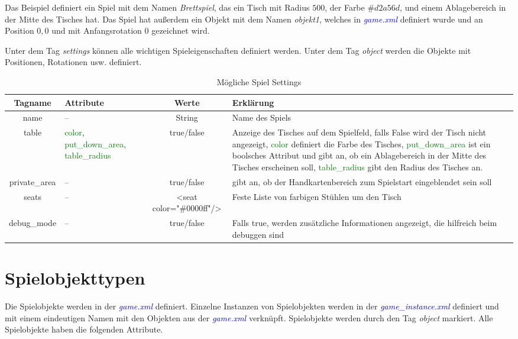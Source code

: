 \documentclass{scrbook}
\newcommand{\gamefile}[1]{\textit{\textcolor{blue}{#1}}\xspace}
\newcommand{\game}{\gamefile{game.xml}}
\newcommand{\gameinstance}{\gamefile{game\_instance.xml}}
\newcommand{\xmlattribute}[1]{\textcolor{green}{#1}}
\begin{document}
	Das Beispiel definiert ein Spiel mit dem Namen \textit{Brettspiel}, das ein Tisch mit Radius $500$, der Farbe $\#d2a56d$, und einem Ablagebereich in der Mitte des Tisches hat. Das Spiel hat außerdem ein Objekt mit dem Namen \textit{objekt1}, welches in \game definiert wurde und an Position $0, 0$ und mit Anfangsrotation $0$ gezeichnet wird.
	
	Unter dem Tag \textit{settings} können alle wichtigen Spieleigenschaften definiert werden. Unter dem Tag \textit{object} werden die Objekte mit Positionen, Rotationen usw. definiert.
	
	\begin{table}[!h]
		\centering
		\renewcommand{\arraystretch}{1.5}
		\begin{tabularx}{\textwidth}{c|X|c|X}
			Tagname & Attribute & Werte & Erklärung\\\hline
			
			name & -- & String & Name des Spiels\\
			table & \xmlattribute{color}, \xmlattribute{put\_down\_area}, \xmlattribute{table\_radius} & true/false & Anzeige des Tisches auf dem Spielfeld, falls False wird der Tisch nicht angezeigt, \xmlattribute{color} definiert die Farbe des Tisches, \xmlattribute{put\_down\_area} ist ein boolsches Attribut und gibt an, ob ein Ablagebereich in der Mitte des Tisches erscheinen soll, \xmlattribute{table\_radius} gibt den Radius des Tisches an.\\
			private\_area & -- & true/false & gibt an, ob der Handkartenbereich zum Spielstart eingeblendet sein soll\\
			seats & -- & <seat color="\#0000ff"/> & Feste Liste von farbigen Stühlen um den Tisch\\
			debug\_mode & -- & true/false & Falls true, werden zusätzliche Informationen angezeigt, die hilfreich beim debuggen sind\\
		\end{tabularx}
	\caption{Mögliche Spiel Settings}
	\end{table}
	\section{Spielobjekttypen}
	
	Die Spielobjekte werden in der \game definiert. Einzelne Instanzen von Spielobjekten werden in der \gameinstance definiert und mit einem eindeutigen Namen mit den Objekten aus der \game verknüpft. Spielobjekte werden durch den Tag \textit{object} markiert. Alle Spielobjekte haben die folgenden Attribute.
	
\end{document}

